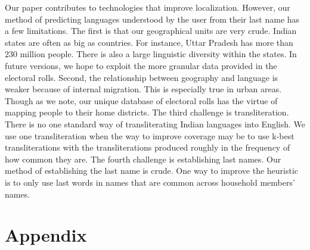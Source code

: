 \documentclass[11pt,  letterpaper]{article}
\begin{document}
Our paper contributes to technologies that improve localization. However, our method of predicting languages understood by the user from their last name has a few limitations. The first is that our geographical units are very crude. Indian states are often as big as countries. For instance, Uttar Pradesh has more than 230 million people. There is also a large linguistic diversity within the states. In future versions, we hope to exploit the more granular data provided in the electoral rolls. Second, the relationship between geography and language is weaker because of internal migration. This is especially true in urban areas. Though as we note, our unique database of electoral rolls has the virtue of mapping people to their home districts. The third challenge is transliteration. There is no one standard way of transliterating Indian languages into English. We use one transliteration when the way to improve coverage may be to use k-best transliterations with the transliterations produced roughly in the frequency of how common they are. The fourth challenge is establishing last names. Our method of establishing the last name is crude. One way to improve the heuristic is to only use last words in names that are common across household members’ names. 

\newpage



\clearpage 
\section{Appendix}

\end{document}
